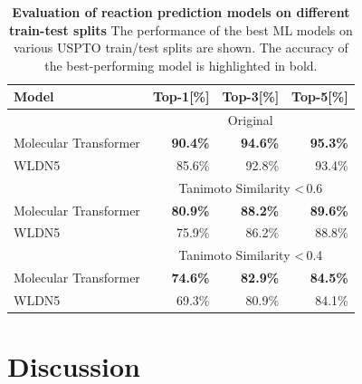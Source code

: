 \begin{table}[!h]
    \centering
    \caption{ \textbf{Evaluation of reaction prediction models on different train-test splits} The performance of the best ML models on various USPTO train/test splits are shown. The accuracy of the best-performing model is highlighted in bold.}
    \centering
    \label{table:tanimoto}
    \begin{tabular*}{0.8\textwidth}{l@{\extracolsep{\fill}}rrr}
    \toprule
        \textbf{Model} & \textbf{Top-1[\%]} & \textbf{Top-3[\%]} & \textbf{Top-5[\%]}\\ 
        \midrule 
    & \multicolumn{3}{c}{Original} \\
    \midrule
    Molecular Transformer & \textbf{90.4\%} & \textbf{94.6\%} & \textbf{95.3\%}  \\
    WLDN5 & 85.6\% & 92.8\% & 93.4\%  \\
    \midrule 
    & \multicolumn{3}{c}{Tanimoto Similarity \textless\,0.6} \\
    \midrule
    Molecular Transformer & \textbf{80.9\%} & \textbf{88.2\%} & \textbf{89.6\%}  \\
    WLDN5 & 75.9\% & 86.2\% & 88.8\%  \\
    \midrule
    & \multicolumn{3}{c}{Tanimoto Similarity \textless\,0.4}\\
    \midrule
    Molecular Transformer & \textbf{74.6\%} & \textbf{82.9\%} & \textbf{84.5\%} \\
    WLDN5 & 69.3\% & 80.9\% & 84.1\% \\
    \bottomrule
    \end{tabular*}
\end{table}

\section{Discussion}


